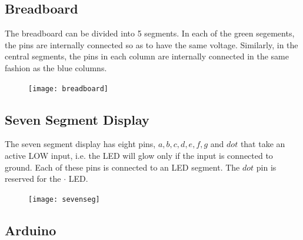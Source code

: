 
\subsection{Breadboard}
The breadboard can be divided into 5 segments.  In each of the green segements, the pins are internally connected so as to have the same voltage.  Similarly, in the central segments, the pins in each column  are internally connected in the same fashion as the blue columns. 
\begin{figure}
\begin{center}
\texttt{[image: breadboard]}
\end{center}
\caption{}
\label{fig:breadboard}
\end{figure}



\subsection{Seven Segment Display}
The seven segment display has eight pins, $a, b, c, d, e, f, g$ and $dot$ that take an active LOW input, i.e.  the LED will glow only if the input is connected to ground.  Each of these pins is connected to an LED segment.  The $dot$ pin is  reserved for the $\cdot$ LED.  
%
\begin{figure}
\begin{center}
\texttt{[image: sevenseg]}
\end{center}
\caption{}
\label{fig:sevenseg}
\end{figure}

\subsection{Arduino}


